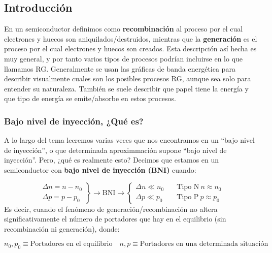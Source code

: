 \subsection{Introducción}

En un semiconductor definimos como \textbf{recombinación} al proceso por el cual electrones y huecos son aniquilados/destruidos, mientras que la \textbf{generación} es el proceso por el cual electrones y huecos son creados. Esta descripción así hecha es muy general, y por tanto varios tipos de procesos podrían incluirse en lo que llamamos RG. Generalmente se usan las gráficas de banda energética para describir visualmente cuales son los posibles procesos RG, aunque sea solo para entender su naturaleza. También se suele describir que papel tiene la energía y que tipo de energía se emite/absorbe en estos procesos.

\subsubsection{Bajo nivel de inyección, ¿Qué es?}

A lo largo del tema leeremos varias veces que nos encontramos en un ``bajo nivel de inyección'', o que determinada aproximmación supone ``bajo nivel de inyección''. Pero, ¿qué es realmente esto? Decimos que estamos en un semiconductor con \textbf{bajo nivel de inyección (BNI)} cuando:


\begin{equation}
	\left.
	\begin{array}{l}
	\Delta n = n - n_{0}  \\
	\Delta p = p - p_{0} \end{array} \right\rbrace \rightarrow \text{BNI} \rightarrow \left\lbrace \begin{array}{ll}
		\Delta n \ll n_0 & \quad \text{Tipo N} \ n \approx n_0 \\
		\Delta p \ll p_0 & \quad \text{Tipo P} \ p \approx p_0 
	\end{array} \right. 
\end{equation}
Es decir, cuando el fenómeno de generación/recombinación no altera significativamente el número de portadores que hay en el equilibrio (sin recombinación ni generación), donde:

\begin{equation*}
	n_{0},p_{0} \equiv \text{Portadores en el equilibrio} \quad n,p \equiv \text{Portadores en una determinada situación}
\end{equation*}


